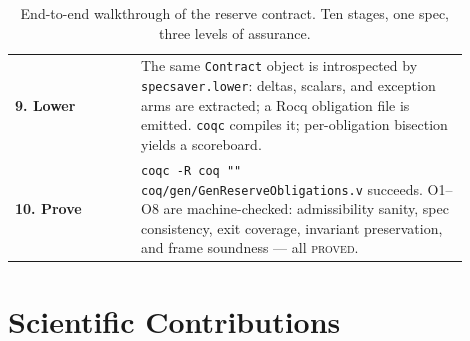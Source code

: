 \documentclass[11pt,a4paper]{article}
\begin{document}
\begin{table}[t]
\begin{tabular}{@{}p{0.25\linewidth}p{0.65\linewidth}@{}}
\textbf{9. Lower} &
  The same \texttt{Contract} object is introspected by \texttt{specsaver.lower}: deltas,
  scalars, and exception arms are extracted; a Rocq obligation file is emitted.
  \texttt{coqc} compiles it; per-obligation bisection yields a scoreboard. \\[8pt]

\textbf{10. Prove} &
  \texttt{coqc -R coq "" coq/gen/GenReserveObligations.v} succeeds.
  O1--O8 are machine-checked: admissibility sanity, spec consistency, exit coverage,
  invariant preservation, and frame soundness --- all \textsc{proved}. \\
\bottomrule
\end{tabular}
\caption{End-to-end walkthrough of the reserve contract.  Ten stages,
one spec, three levels of assurance.}
\label{tab:walkthrough}
\end{table}

\section{Scientific Contributions}\label{sec:contributions}
\end{document}
